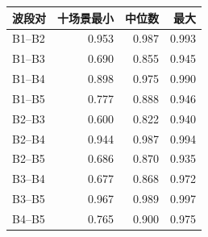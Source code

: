 \begin{tabular}{@{}lrrr@{}}
\toprule
波段对 & 十场景最小 & 中位数 & 最大\\
\midrule
B1--B2 & 0.953 & 0.987 & 0.993 \\
B1--B3 & 0.690 & 0.855 & 0.945 \\
B1--B4 & 0.898 & 0.975 & 0.990 \\
B1--B5 & 0.777 & 0.888 & 0.946 \\
B2--B3 & 0.600 & 0.822 & 0.940 \\
B2--B4 & 0.944 & 0.987 & 0.994 \\
B2--B5 & 0.686 & 0.870 & 0.935 \\
B3--B4 & 0.677 & 0.868 & 0.972 \\
B3--B5 & 0.967 & 0.989 & 0.997 \\
B4--B5 & 0.765 & 0.900 & 0.975 \\
\bottomrule
\end{tabular}
